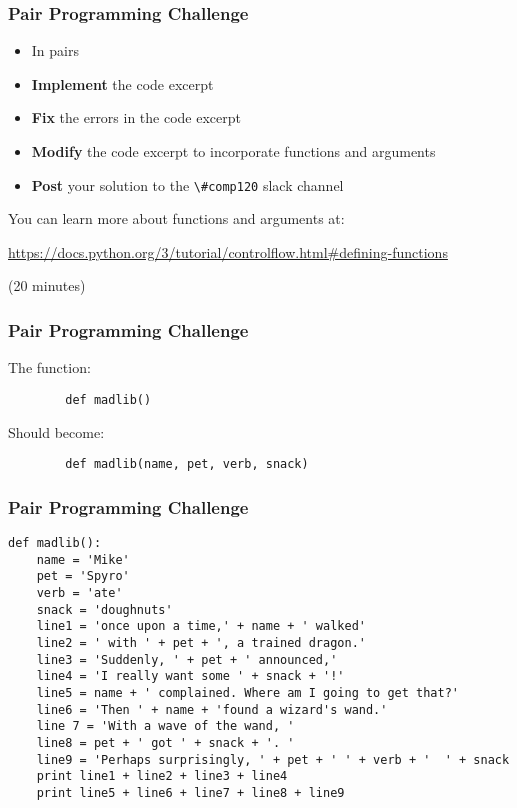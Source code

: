 \begin{frame}
	\frametitle{Pair Programming Challenge}
	
	\begin{itemize}
		\item In pairs
		\item \textbf{Implement} the code excerpt
		\item \textbf{Fix} the errors in the code excerpt
		\item \textbf{Modify} the code excerpt to incorporate functions and arguments
		\item \textbf{Post} your solution to the \lstinline{\#comp120} slack channel
	\end{itemize}
	
	You can learn more about functions and arguments at:
	
	\vspace{1em}
	
	 \url{https://docs.python.org/3/tutorial/controlflow.html\#defining-functions}
	
	\vspace{1em}
	
	(20 minutes)
	
\end{frame}

\begin{frame}[fragile]
	\frametitle{Pair Programming Challenge}
	
	The function:

	\begin{lstlisting}
		def madlib()
	\end{lstlisting}
	
	\vspace{1.5em}
	
	Should become:
	
	\begin{lstlisting}
		def madlib(name, pet, verb, snack)
	\end{lstlisting}
	
\end{frame}

\begin{frame}[fragile]
	\frametitle{Pair Programming Challenge}
	
	\begin{lstlisting}
def madlib():
	name = 'Mike'
	pet = 'Spyro'
	verb = 'ate'
	snack = 'doughnuts'
	line1 = 'once upon a time,' + name + ' walked'
	line2 = ' with ' + pet + ', a trained dragon.'
	line3 = 'Suddenly, ' + pet + ' announced,'
	line4 = 'I really want some ' + snack + '!'
	line5 = name + ' complained. Where am I going to get that?'
	line6 = 'Then ' + name + 'found a wizard's wand.'
	line 7 = 'With a wave of the wand, '
	line8 = pet + ' got ' + snack + '. '
	line9 = 'Perhaps surprisingly, ' + pet + ' ' + verb + '  ' + snack
	print line1 + line2 + line3 + line4
	print line5 + line6 + line7 + line8 + line9

\end{lstlisting}
	
\end{frame}

